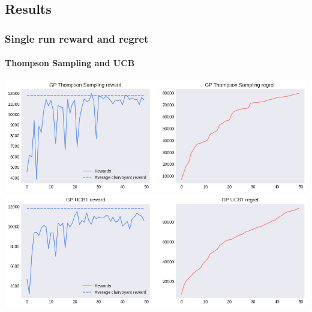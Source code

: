
\subsection{Results}


\begin{frame}[plain]

\frametitle{Single run reward and regret}
\framesubtitle{Thompson Sampling and UCB}

\begin{center}
	\includegraphics[scale=0.4]{img/Graphs/uncertain_alpha_unit/image1.png}
	\includegraphics[scale=0.4]{img/Graphs/uncertain_alpha_unit/image2.png}
\end{center}

\end{frame}


